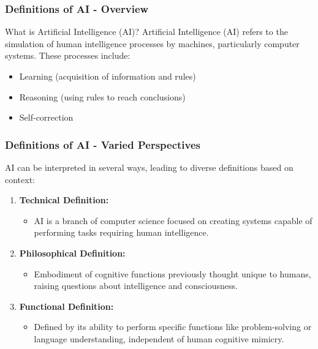 \documentclass{beamer}
\begin{document}
\begin{frame}[fragile]
    \frametitle{Definitions of AI - Overview}
    \begin{block}{What is Artificial Intelligence (AI)?}
        Artificial Intelligence (AI) refers to the simulation of human intelligence processes by machines, particularly computer systems. These processes include:
        \begin{itemize}
            \item Learning (acquisition of information and rules)
            \item Reasoning (using rules to reach conclusions)
            \item Self-correction
        \end{itemize}
    \end{block}
\end{frame}

\begin{frame}[fragile]
    \frametitle{Definitions of AI - Varied Perspectives}
    AI can be interpreted in several ways, leading to diverse definitions based on context:
    \begin{enumerate}
        \item \textbf{Technical Definition:} 
            \begin{itemize}
                \item AI is a branch of computer science focused on creating systems capable of performing tasks requiring human intelligence.
            \end{itemize}
            
        \item \textbf{Philosophical Definition:} 
            \begin{itemize}
                \item Embodiment of cognitive functions previously thought unique to humans, raising questions about intelligence and consciousness.
            \end{itemize}
        
        \item \textbf{Functional Definition:} 
            \begin{itemize}
                \item Defined by its ability to perform specific functions like problem-solving or language understanding, independent of human cognitive mimicry.
            \end{itemize}
    \end{enumerate}
\end{frame}
\end{document}

